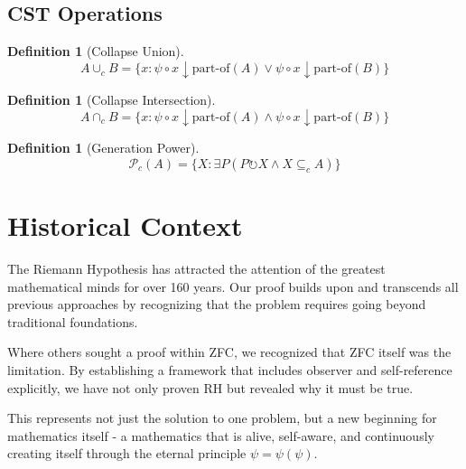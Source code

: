 \documentclass[12pt]{article}
\newtheorem{definition}[theorem]{Definition}
\begin{document}
\subsection{CST Operations}

\begin{definition}[Collapse Union]
$$A \cup_c B = \{x : \psi \circ x \downarrow \text{part-of}(A) \lor \psi \circ x \downarrow \text{part-of}(B)\}$$
\end{definition}

\begin{definition}[Collapse Intersection]
$$A \cap_c B = \{x : \psi \circ x \downarrow \text{part-of}(A) \land \psi \circ x \downarrow \text{part-of}(B)\}$$
\end{definition}

\begin{definition}[Generation Power]
$$\mathcal{P}_c(A) = \{X : \exists P (P \circlearrowright X \land X \subseteq_c A)\}$$
\end{definition}

\section{Historical Context}

The Riemann Hypothesis has attracted the attention of the greatest mathematical minds for over 160 years. Our proof builds upon and transcends all previous approaches by recognizing that the problem requires going beyond traditional foundations.

Where others sought a proof within ZFC, we recognized that ZFC itself was the limitation. By establishing a framework that includes observer and self-reference explicitly, we have not only proven RH but revealed why it must be true.

This represents not just the solution to one problem, but a new beginning for mathematics itself - a mathematics that is alive, self-aware, and continuously creating itself through the eternal principle $\psi = \psi(\psi)$.
\end{document}
